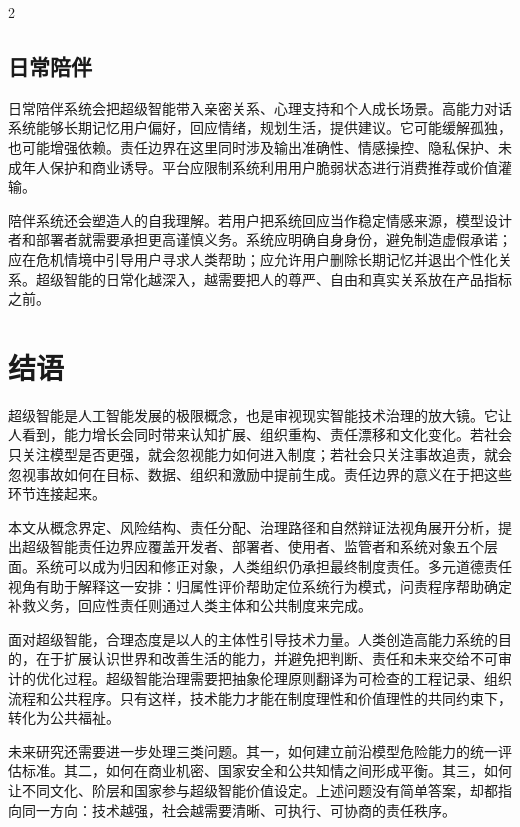 \documentclass[a4paper,UTF8,zihao=5,twoside]{ctexart}
\begin{document}
\begin{multicols}{2}
\subsection{日常陪伴}

日常陪伴系统会把超级智能带入亲密关系、心理支持和个人成长场景。高能力对话系统能够长期记忆用户偏好，回应情绪，规划生活，提供建议。它可能缓解孤独，也可能增强依赖。责任边界在这里同时涉及输出准确性、情感操控、隐私保护、未成年人保护和商业诱导。平台应限制系统利用用户脆弱状态进行消费推荐或价值灌输。

陪伴系统还会塑造人的自我理解。若用户把系统回应当作稳定情感来源，模型设计者和部署者就需要承担更高谨慎义务。系统应明确自身身份，避免制造虚假承诺；应在危机情境中引导用户寻求人类帮助；应允许用户删除长期记忆并退出个性化关系。超级智能的日常化越深入，越需要把人的尊严、自由和真实关系放在产品指标之前。

\section{结语}

超级智能是人工智能发展的极限概念，也是审视现实智能技术治理的放大镜。它让人看到，能力增长会同时带来认知扩展、组织重构、责任漂移和文化变化。若社会只关注模型是否更强，就会忽视能力如何进入制度；若社会只关注事故追责，就会忽视事故如何在目标、数据、组织和激励中提前生成。责任边界的意义在于把这些环节连接起来。

本文从概念界定、风险结构、责任分配、治理路径和自然辩证法视角展开分析，提出超级智能责任边界应覆盖开发者、部署者、使用者、监管者和系统对象五个层面。系统可以成为归因和修正对象，人类组织仍承担最终制度责任。多元道德责任视角有助于解释这一安排：归属性评价帮助定位系统行为模式，问责程序帮助确定补救义务，回应性责任则通过人类主体和公共制度来完成。

面对超级智能，合理态度是以人的主体性引导技术力量。人类创造高能力系统的目的，在于扩展认识世界和改善生活的能力，并避免把判断、责任和未来交给不可审计的优化过程。超级智能治理需要把抽象伦理原则翻译为可检查的工程记录、组织流程和公共程序。只有这样，技术能力才能在制度理性和价值理性的共同约束下，转化为公共福祉。

未来研究还需要进一步处理三类问题。其一，如何建立前沿模型危险能力的统一评估标准。其二，如何在商业机密、国家安全和公共知情之间形成平衡。其三，如何让不同文化、阶层和国家参与超级智能价值设定。上述问题没有简单答案，却都指向同一方向：技术越强，社会越需要清晰、可执行、可协商的责任秩序。


\end{multicols}
\end{document}

